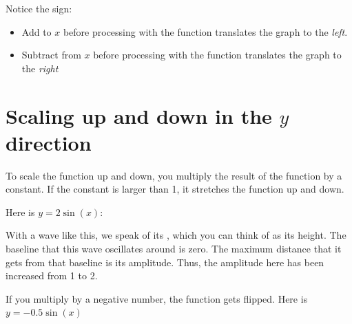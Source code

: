 Notice the sign:
\begin{itemize}
\item Add to $x$ before processing with the function translates the graph to the \emph{left}.
\item Subtract from $x$ before processing with the function translates the graph to the \emph{right}
\end{itemize}

\section{Scaling up and down in the $y$ direction}

To scale the function up and down, you multiply the result of the
function by a constant.  If the constant is larger than 1, it
stretches the function up and down.

Here is $y = 2\sin(x)$:


With a wave like this, we speak of its , which you
can think of as its height. The baseline that this wave oscillates
around is zero. The maximum distance that it gets from that baseline
is its amplitude.  Thus, the amplitude here has been increased from 1
to 2.

If you multiply by a negative number, the function gets flipped.  Here is $y = -0.5 \sin(x)$

